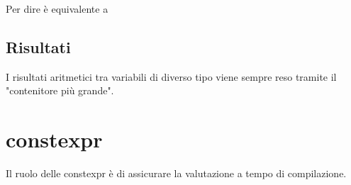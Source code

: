 \documentclass[11pt,a4paper]{book}
\begin{document}
Per dire
\label{code: 148}
è equivalente a
\label{code: 149}

\subsection{Risultati}
I risultati aritmetici tra variabili di diverso tipo viene sempre reso tramite il "contenitore più grande".

\section{constexpr}
Il ruolo delle constexpr è di assicurare la valutazione a tempo di compilazione.
\end{document}
